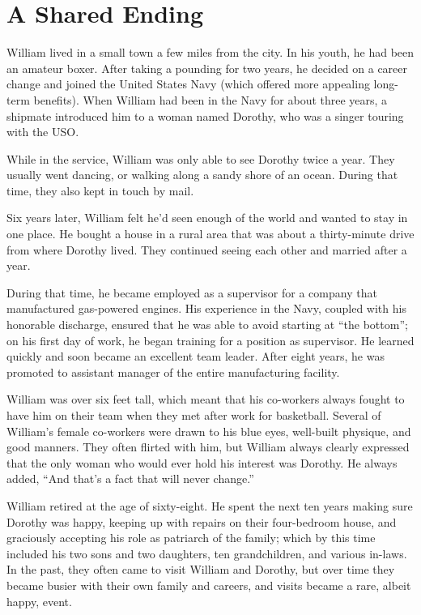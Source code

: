 \chapter{A Shared Ending}

William lived in a small town a few miles from the city. In his youth, he had been an amateur boxer. After taking a pounding for two years, he decided on a career change and joined the United States Navy (which offered more appealing long-term benefits). When William had been in the Navy for about three years, a shipmate introduced him to a woman named Dorothy, who was a singer touring with the USO.

While in the service, William was only able to see Dorothy twice a year. They usually went dancing, or walking along a sandy shore of an ocean. During that time, they also kept in touch by mail.

Six years later, William felt he'd seen enough of the world and wanted to stay in one place. He bought a house in a rural area that was about a thirty-minute drive from where Dorothy lived. They continued seeing each other and married after a year.

During that time, he became employed as a supervisor for a company that manufactured gas-powered engines. His experience in the Navy, coupled with his honorable discharge, ensured that he was able to avoid starting at “the bottom”; on his first day of work, he began training for a position as supervisor. He learned quickly and soon became an excellent team leader. After eight years, he was promoted to assistant manager of the entire manufacturing facility.

William was over six feet tall, which meant that his co-workers always fought to have him on their team when they met after work for basketball. Several of William's female co-workers were drawn to his blue eyes, well-built physique, and good manners. They often flirted with him, but William always clearly expressed that the only woman who would ever hold his interest was Dorothy. He always added, “And that's a fact that will never change.”

William retired at the age of sixty-eight. He spent the next ten years making sure Dorothy was happy, keeping up with repairs on their four-bedroom house, and graciously accepting his role as patriarch of the family; which by this time included his two sons and two daughters, ten grandchildren, and various in-laws. In the past, they often came to visit William and Dorothy, but over time they became busier with their own family and careers, and visits became a rare, albeit happy, event.

